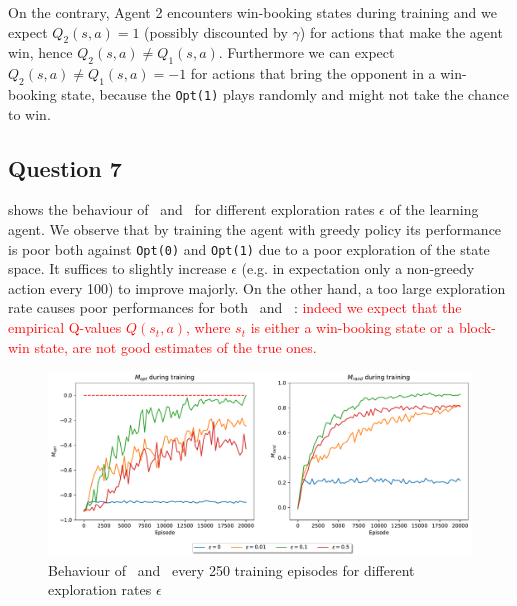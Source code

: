 \documentclass[10pt]{IEEEtran}
\begin{document}
On the contrary, Agent 2 encounters win-booking states during training and we expect $Q_2(s,a) = 1$ (possibly discounted by $\gamma$) for actions that make the agent win, hence $Q_2(s,a) \neq Q_1(s,a)$. Furthermore we can expect $Q_2(s,a) \neq Q_1(s,a) = -1$ for actions that bring the opponent in a win-booking state, because the \texttt{Opt(1)} plays randomly and might not take the chance to win.

\subsection*{Question 7}
 shows the behaviour of \mopt\ and \mrand\ for different exploration rates $\epsilon$ of the learning agent. We observe that by training the agent with greedy policy its performance is poor both against \texttt{Opt(0)} and \texttt{Opt(1)} due to a poor exploration of the state space. It suffices to slightly increase $\epsilon$ (e.g. in expectation only a non-greedy action every 100) to improve majorly. On the other hand, a too large exploration rate causes poor performances for both \mopt\ and \mrand\ : \textcolor{red}{indeed we expect that the empirical Q-values $Q(s_t, a)$, where $s_t$ is either a win-booking state or a block-win state, are not good estimates of the true ones.}
\begin{figure}[h]
    \centering
    \includegraphics[width=\linewidth]{code/figures/performance_epsilon_self.pdf}
    \caption{Behaviour of \mopt\ and \mrand\ every 250 training episodes for different exploration rates $\epsilon$}
    \label{plot_question7}
\end{figure}
\end{document}
